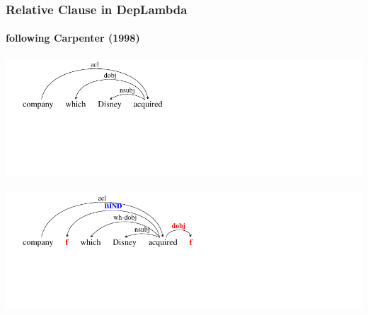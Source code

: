 \documentclass[mathserif,12pt]{beamer}
\newcommand \ignore[1]{}
\newcommand{\hlight}[1]{{\color{blue!80} #1}}
\newcommand{\bind}{\textsc{bind}}
\begin{document}
\begin{frame}
\frametitle{Relative Clause in DepLambda}
\framesubtitle{following Carpenter (1998)}
\begin{center}
\includegraphics[trim=1em 7.5em 22em 0em,clip=true,scale=1]{figures/relative-object-extraction-ud}

\vspace{3em}

\includegraphics[trim=1em 6.5em 17em 0em,clip=true,scale=1]{figures/relative-object-extraction-binding-ud}

\ignore{
\begin{small}
\begin{tabular}{l}\\
  $\mathrm{(acl}$ \hspace{0.3cm}  $\mathrm{company}$ \\ 
  \hspace*{1cm} ($\hlight{\bind}$ $\alert{f}$ \\
  \hspace*{2cm}  $\mathrm{(wh}$-$\mathrm{dobj}$  \\  
  \hspace*{3cm} $\mathrm{(nsubj}$ \\
  \hspace*{4cm} $\mathrm{(dobj~acquired}$~$f)$\\
  \hspace*{3cm}$\mathrm{~Disney))}$ \\
  \hspace*{2cm} $\mathrm{which)))}$
\end{tabular}
\end{small}
}
\end{center}
\end{frame}
\end{document}
